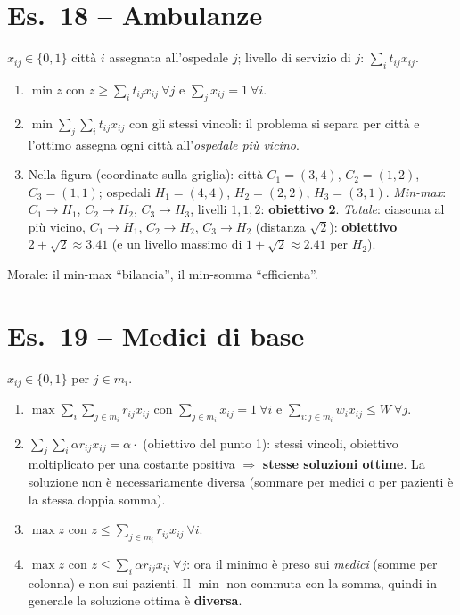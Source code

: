 \section*{Es.\ 18 -- Ambulanze}
$x_{ij}\in\{0,1\}$ città $i$ assegnata all'ospedale $j$; livello di servizio di $j$: $\sum_it_{ij}x_{ij}$.
\begin{enumerate}[nosep]
\item $\min z$ con $z\ge\sum_it_{ij}x_{ij}\ \forall j$ e $\sum_jx_{ij}=1\ \forall i$.
\item $\min\sum_j\sum_it_{ij}x_{ij}$ con gli stessi vincoli: il problema si separa per città e l'ottimo assegna ogni città all'\emph{ospedale più vicino}.
\item Nella figura (coordinate sulla griglia): città $C_1=(3,4)$, $C_2=(1,2)$, $C_3=(1,1)$; ospedali $H_1=(4,4)$, $H_2=(2,2)$, $H_3=(3,1)$.
\emph{Min-max}: $C_1\to H_1$, $C_2\to H_2$, $C_3\to H_3$, livelli $1,1,2$: \textbf{obiettivo 2}.
\emph{Totale}: ciascuna al più vicino, $C_1\to H_1$, $C_2\to H_2$, $C_3\to H_2$ (distanza $\sqrt2$): \textbf{obiettivo $2+\sqrt2\approx3.41$} (e un livello massimo di $1+\sqrt2\approx2.41$ per $H_2$).
\end{enumerate}
Morale: il min-max ``bilancia'', il min-somma ``efficienta''.

\section*{Es.\ 19 -- Medici di base}
$x_{ij}\in\{0,1\}$ per $j\in m_i$.
\begin{enumerate}[nosep]
\item $\max\sum_i\sum_{j\in m_i}r_{ij}x_{ij}$ con $\sum_{j\in m_i}x_{ij}=1\ \forall i$ e $\sum_{i:j\in m_i}w_ix_{ij}\le W\ \forall j$.
\item $\sum_j\sum_i\alpha r_{ij}x_{ij}=\alpha\cdot$ (obiettivo del punto 1): stessi vincoli, obiettivo moltiplicato per una costante positiva $\Rightarrow$ \textbf{stesse soluzioni ottime}. La soluzione non è necessariamente diversa (sommare per medici o per pazienti è la stessa doppia somma).
\item $\max z$ con $z\le\sum_{j\in m_i}r_{ij}x_{ij}\ \forall i$.
\item $\max z$ con $z\le\sum_i\alpha r_{ij}x_{ij}\ \forall j$: ora il minimo è preso sui \emph{medici} (somme per colonna) e non sui pazienti. Il $\min$ non commuta con la somma, quindi in generale la soluzione ottima è \textbf{diversa}.
\end{enumerate}


